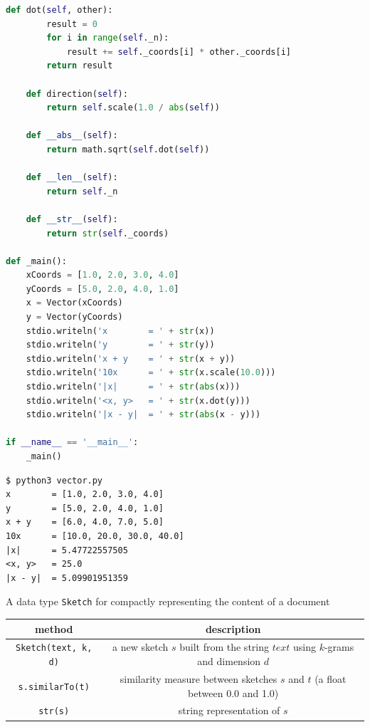 \documentclass[8pt,a4paper,compress]{beamer}
\begin{document}
\begin{frame}[fragile]
\pause

\begin{lstlisting}[language=Python,style=focusin]
    def dot(self, other):
        result = 0
        for i in range(self._n):
            result += self._coords[i] * other._coords[i]
        return result

    def direction(self):
        return self.scale(1.0 / abs(self))
     
    def __abs__(self):
        return math.sqrt(self.dot(self))

    def __len__(self):
        return self._n

    def __str__(self):
        return str(self._coords)
        
def _main():
    xCoords = [1.0, 2.0, 3.0, 4.0]
    yCoords = [5.0, 2.0, 4.0, 1.0]
    x = Vector(xCoords)
    y = Vector(yCoords)
    stdio.writeln('x        = ' + str(x))
    stdio.writeln('y        = ' + str(y))
    stdio.writeln('x + y    = ' + str(x + y))
    stdio.writeln('10x      = ' + str(x.scale(10.0)))
    stdio.writeln('|x|      = ' + str(abs(x)))
    stdio.writeln('<x, y>   = ' + str(x.dot(y)))
    stdio.writeln('|x - y|  = ' + str(abs(x - y)))

if __name__ == '__main__':
    _main()
\end{lstlisting}
\end{frame}

\begin{frame}[fragile]
\pause

\begin{lstlisting}[language={},style=focusin]
$ python3 vector.py
x        = [1.0, 2.0, 3.0, 4.0]
y        = [5.0, 2.0, 4.0, 1.0]
x + y    = [6.0, 4.0, 7.0, 5.0]
10x      = [10.0, 20.0, 30.0, 40.0]
|x|      = 5.47722557505
<x, y>   = 25.0
|x - y|  = 5.09901951359
\end{lstlisting}
\end{frame}

\begin{frame}[fragile]
\pause

A data type \lstinline{Sketch} for compactly representing the content of a document
\begin{center}
\begin{tabular}{cc}
method & description \\ \hline
\lstinline$Sketch(text, k, d)$ & \makecell{a new sketch $s$ built from the string $text$ \\ using $k$-grams and dimension $d$} \\
\lstinline$s.similarTo(t)$ & \makecell{similarity measure between sketches $s$ and $t$ (a float \\ between 0.0 and 1.0)} \\
\lstinline$str(s)$ & string representation of $s$
\end{tabular} 
\end{center}
\end{frame}
\end{document}
